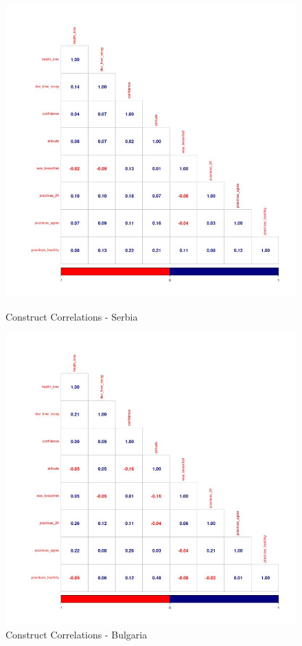 \documentclass{article}
\begin{document}
\begin{figure}[h!]
\begin{minipage}{.5\textwidth}
    \centering
    \includegraphics[scale=0.33]{descriptives/plots/correlations_constructs_Serbia_Baseline.jpg}
    \caption{Construct Correlations - Serbia}
    \label{fig:serbia correlations}
\end{minipage}%
\begin{minipage}{.5\textwidth}
    \includegraphics[scale=0.33]{descriptives/plots/correlations_constructs_Bulgaria_Baseline.jpg}
    \caption{Construct Correlations - Bulgaria}
    \label{fig:bulgaria correlations}
\end{minipage}%
\end{figure}
\end{document}
